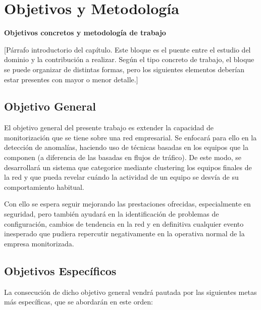 \chapter{Objetivos y Metodología}\label{chap:objetivos}
\textbf{Objetivos concretos y metodología de trabajo}

[Párrafo introductorio del capítulo. Este bloque es el puente entre el estudio del dominio y la contribución a realizar. Según el tipo concreto de trabajo, el bloque se puede organizar de distintas formas, pero los siguientes elementos deberían estar presentes con mayor o menor detalle.]

\section{Objetivo General}\label{sec:objgeneral}
El objetivo general del presente trabajo es extender la capacidad de monitorización que se tiene sobre una red empresarial.
Se enfocará para ello en la detección de anomalías, haciendo uso de técnicas basadas en los equipos que la componen (a diferencia de las basadas en flujos de tráfico).
De este modo, se desarrollará un sistema que categorice mediante clustering los equipos finales de la red
y que pueda revelar cuándo la actividad de un equipo se desvía de su comportamiento habitual.

Con ello se espera seguir mejorando las prestaciones ofrecidas, especialmente en seguridad, pero también ayudará en la identificación de problemas de configuración, cambios de tendencia en la red y en definitiva cualquier evento inesperado que pudiera repercutir negativamente en la operativa normal de la empresa monitorizada.

\section{Objetivos Específicos}\label{sec:objespecificos}
La consecución de dicho objetivo general vendrá pautada por las siguientes metas más específicas, que se abordarán en este orden:

